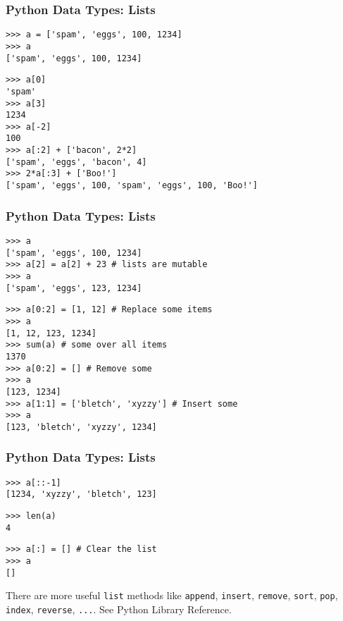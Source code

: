 \begin{frame}[fragile]
    \frametitle{Python Data Types: Lists}
    \begin{myColorBox}{0.9}{}
\begin{verbatim}
>>> a = ['spam', 'eggs', 100, 1234]
>>> a
['spam', 'eggs', 100, 1234]
\end{verbatim}
    \end{myColorBox}
    \pause
    \begin{myColorBox}{0.9}{}
\begin{verbatim}
>>> a[0]
'spam'
>>> a[3]
1234
>>> a[-2]
100
>>> a[:2] + ['bacon', 2*2]
['spam', 'eggs', 'bacon', 4]
>>> 2*a[:3] + ['Boo!']
['spam', 'eggs', 100, 'spam', 'eggs', 100, 'Boo!']
\end{verbatim}
    \end{myColorBox}
\end{frame}

\begin{frame}[fragile]
    \frametitle{Python Data Types: Lists}
    \begin{myColorBox}{0.9}{}
\begin{verbatim}
>>> a
['spam', 'eggs', 100, 1234]
>>> a[2] = a[2] + 23 # lists are mutable
>>> a
['spam', 'eggs', 123, 1234]
\end{verbatim}
    \end{myColorBox}
    \pause
    \begin{myColorBox}{0.9}{}
\begin{verbatim}
>>> a[0:2] = [1, 12] # Replace some items
>>> a
[1, 12, 123, 1234]
>>> sum(a) # some over all items
1370
>>> a[0:2] = [] # Remove some
>>> a
[123, 1234]
>>> a[1:1] = ['bletch', 'xyzzy'] # Insert some
>>> a
[123, 'bletch', 'xyzzy', 1234]
\end{verbatim}
    \end{myColorBox}
\end{frame}


\begin{frame}[fragile]
    \frametitle{Python Data Types: Lists}
    \begin{myColorBox}{0.9}{}
\begin{verbatim}
>>> a[::-1]
[1234, 'xyzzy', 'bletch', 123]
\end{verbatim}
    \end{myColorBox}
    \pause
    \begin{myColorBox}{0.9}{}
\begin{verbatim}
>>> len(a)
4
\end{verbatim}
    \end{myColorBox}
    \pause
    \begin{myColorBox}{0.9}{}
\begin{verbatim}
>>> a[:] = [] # Clear the list
>>> a
[]
\end{verbatim}
    \end{myColorBox}
    \pause
    There are more useful \verb#list# methods like \verb#append#, \verb#insert#, \verb#remove#, \verb#sort#,
    \verb#pop#, \verb#index#, \verb#reverse#, \verb#...#. See Python Library Reference.
\end{frame}


